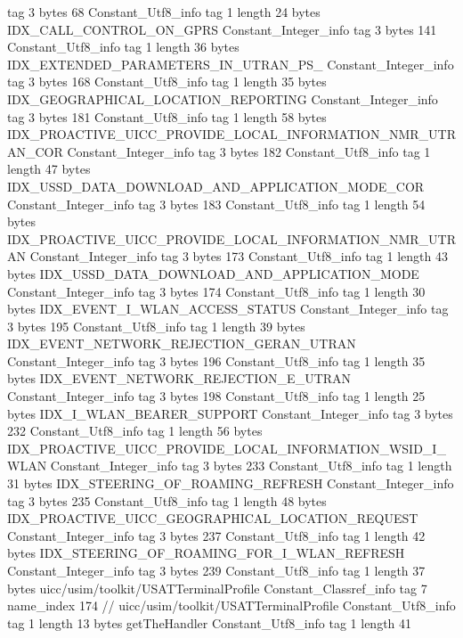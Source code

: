 {{{			tag	3
			bytes	68
		}
		Constant_Utf8_info {
			tag	1
			length	24
			bytes	IDX_CALL_CONTROL_ON_GPRS
		}
		Constant_Integer_info {
			tag	3
			bytes	141
		}
		Constant_Utf8_info {
			tag	1
			length	36
			bytes	IDX_EXTENDED_PARAMETERS_IN_UTRAN_PS_
		}
		Constant_Integer_info {
			tag	3
			bytes	168
		}
		Constant_Utf8_info {
			tag	1
			length	35
			bytes	IDX_GEOGRAPHICAL_LOCATION_REPORTING
		}
		Constant_Integer_info {
			tag	3
			bytes	181
		}
		Constant_Utf8_info {
			tag	1
			length	58
			bytes	IDX_PROACTIVE_UICC_PROVIDE_LOCAL_INFORMATION_NMR_UTRAN_COR
		}
		Constant_Integer_info {
			tag	3
			bytes	182
		}
		Constant_Utf8_info {
			tag	1
			length	47
			bytes	IDX_USSD_DATA_DOWNLOAD_AND_APPLICATION_MODE_COR
		}
		Constant_Integer_info {
			tag	3
			bytes	183
		}
		Constant_Utf8_info {
			tag	1
			length	54
			bytes	IDX_PROACTIVE_UICC_PROVIDE_LOCAL_INFORMATION_NMR_UTRAN
		}
		Constant_Integer_info {
			tag	3
			bytes	173
		}
		Constant_Utf8_info {
			tag	1
			length	43
			bytes	IDX_USSD_DATA_DOWNLOAD_AND_APPLICATION_MODE
		}
		Constant_Integer_info {
			tag	3
			bytes	174
		}
		Constant_Utf8_info {
			tag	1
			length	30
			bytes	IDX_EVENT_I_WLAN_ACCESS_STATUS
		}
		Constant_Integer_info {
			tag	3
			bytes	195
		}
		Constant_Utf8_info {
			tag	1
			length	39
			bytes	IDX_EVENT_NETWORK_REJECTION_GERAN_UTRAN
		}
		Constant_Integer_info {
			tag	3
			bytes	196
		}
		Constant_Utf8_info {
			tag	1
			length	35
			bytes	IDX_EVENT_NETWORK_REJECTION_E_UTRAN
		}
		Constant_Integer_info {
			tag	3
			bytes	198
		}
		Constant_Utf8_info {
			tag	1
			length	25
			bytes	IDX_I_WLAN_BEARER_SUPPORT
		}
		Constant_Integer_info {
			tag	3
			bytes	232
		}
		Constant_Utf8_info {
			tag	1
			length	56
			bytes	IDX_PROACTIVE_UICC_PROVIDE_LOCAL_INFORMATION_WSID_I_WLAN
		}
		Constant_Integer_info {
			tag	3
			bytes	233
		}
		Constant_Utf8_info {
			tag	1
			length	31
			bytes	IDX_STEERING_OF_ROAMING_REFRESH
		}
		Constant_Integer_info {
			tag	3
			bytes	235
		}
		Constant_Utf8_info {
			tag	1
			length	48
			bytes	IDX_PROACTIVE_UICC_GEOGRAPHICAL_LOCATION_REQUEST
		}
		Constant_Integer_info {
			tag	3
			bytes	237
		}
		Constant_Utf8_info {
			tag	1
			length	42
			bytes	IDX_STEERING_OF_ROAMING_FOR_I_WLAN_REFRESH
		}
		Constant_Integer_info {
			tag	3
			bytes	239
		}
		Constant_Utf8_info {
			tag	1
			length	37
			bytes	uicc/usim/toolkit/USATTerminalProfile
		}
		Constant_Classref_info {
			tag	7
			name_index	174		// uicc/usim/toolkit/USATTerminalProfile
		}
		Constant_Utf8_info {
			tag	1
			length	13
			bytes	getTheHandler
		}
		Constant_Utf8_info {
			tag	1
			length	41
}}}
